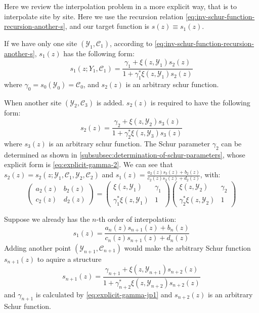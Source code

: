 \documentclass[
	preprint,%
	aps,
	prb,
	showpacs,	
	amsmath, amssymb]{revtex4-2}
\newcommand{\Y}{ {\mathcal{Y}} }
\newcommand{\C}{ {\mathcal{C}} }
\begin{document}
Here we review the interpolation problem in a more explicit 
way, that is to interpolate site by site. Here we use the 
recursion relation \cref{eq:inv-schur-function-recursion-another-s}, 
and our target function is $s(z) \equiv s_1(z)$.

If we have only one site $(\Y_1, \C_1)$, according to 
\cref{eq:inv-schur-function-recursion-another-s}, $s_1(z)$ 
has the following form:
\begin{equation}
	s_1(z; Y_1, \C_1)
	= \frac{\gamma_1 + \xi(z, \Y_1) s_{2}(z) }
		{1 + \gamma_1^* \xi(z, \Y_1) s_{2}(z)}
\end{equation}
where $\gamma_0 = s_0(\Y_0) = \C_0$, and $s_2(z)$ is an 
arbitrary schur function.

When another site $(\Y_2, \C_3)$ is added. $s_2(z)$ is 
required to have the following form:
\begin{equation}
	s_2(z)
	= \frac{\gamma_2 + \xi(z, \Y_2) s_{3}(z) }
		{1 + \gamma_2^* \xi(z, \Y_3) s_{3}(z)}
\end{equation}
where $s_3(z)$ is an arbitrary schur function. 
The Schur parameter $\gamma_2$ can be determined as 
shown in \cref{subsubsec:determination-of-schur-parameters}, 
whose explicit form is \cref{eq:explicit-gamma-2}. 
We can see that $s_2(z) = s_2(z; \Y_1, \C_1, \Y_2, \C_2)$ 
and $s_1(z) = \frac{a_2(z) s_3(z) + b_2(z)}{c_2(z) s_3(z) + d_2(z)}$, 
with:
\begin{equation}\label{eq:explicit-ancd2}
	\left(
		\begin{matrix}
			a_2(z) & b_2(z) \\
			c_2(z) & d_2(z)
		\end{matrix}
	\right)
	= 
	\left(
		\begin{matrix}
			\xi(z, \Y_1)            & \gamma_1 \\
			\gamma_1^* \xi(z, \Y_1) & 1
		\end{matrix}
	\right)
	\left(
		\begin{matrix}
			\xi(z, \Y_2)            & \gamma_2 \\
			\gamma_2^* \xi(z, \Y_2) & 1
		\end{matrix}
	\right)
\end{equation}

Suppose we already has the $n$-th order of interpolation:
\begin{equation}
	s_1(z) = \frac{a_n(z) s_{n+1}(z) + b_n(z)}
		{c_n(z) s_{n+1}(z) + d_n(z)}
\end{equation}
Adding another point $(\Y_{n+1}, \C_{n+1})$ would make the 
arbitrary Schur function $s_{n+1}(z)$ to aquire a structure 
\begin{equation}
	s_{n+1}(z)
	= \frac{\gamma_{n+1} + \xi(z, \Y_{n+1}) s_{n+2}(z) }
		{1 + \gamma_{n+2}^* \xi(z, \Y_{n+2}) s_{n+2}(z)}
\end{equation}
and $\gamma_{n+1}$ is calculated by \cref{eq:explicit-gamma-jp1} 
and $s_{n+2}(z)$ is an arbitrary Schur function.
 
\end{document}
